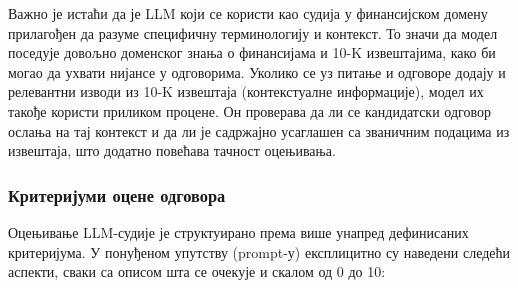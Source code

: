Важно је истаћи да је LLM који се користи као судија у финансијском домену прилагођен да разуме специфичну терминологију и контекст. То значи да модел поседује довољно доменског знања о финансијама и 10-K извештајима, како би могао да ухвати нијансе у одговорима. Уколико се уз питање и одговоре додају и релевантни изводи из 10-K извештаја (контекстуалне информације), модел их такође користи приликом процене. Он проверава да ли се кандидатски одговор ослања на тај контекст и да ли је садржајно усаглашен са званичним подацима из извештаја, што додатно повећава тачност оцењивања.

\subsubsection{Критеријуми оцене одговора}

Оцењивање LLM-судије је структуирано према више унапред дефинисаних критеријума. У понуђеном упутству (prompt-у) експлицитно су наведени следећи аспекти, сваки са описом шта се очекује и скалом од 0 до 10:


